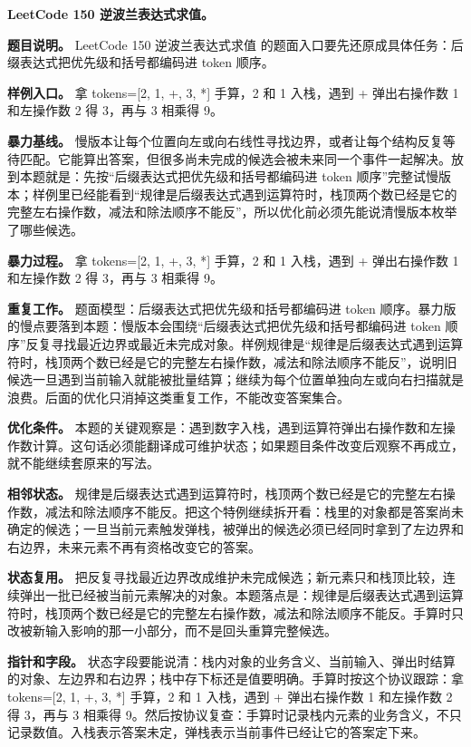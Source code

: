 \noindent\textbf{LeetCode 150 逆波兰表达式求值。}

\textbf{题目说明。} LeetCode 150 逆波兰表达式求值 的题面入口要先还原成具体任务：后缀表达式把优先级和括号都编码进 token 顺序。

\textbf{样例入口。} 拿 tokens=[2, 1, +, 3, *] 手算，2 和 1 入栈，遇到 + 弹出右操作数 1 和左操作数 2 得 3，再与 3 相乘得 9。

\textbf{暴力基线。} 慢版本让每个位置向左或向右线性寻找边界，或者让每个结构反复等待匹配。它能算出答案，但很多尚未完成的候选会被未来同一个事件一起解决。放到本题就是：先按“后缀表达式把优先级和括号都编码进 token 顺序”完整试慢版本；样例里已经能看到“规律是后缀表达式遇到运算符时，栈顶两个数已经是它的完整左右操作数，减法和除法顺序不能反”，所以优化前必须先能说清慢版本枚举了哪些候选。

\textbf{暴力过程。} 拿 tokens=[2, 1, +, 3, *] 手算，2 和 1 入栈，遇到 + 弹出右操作数 1 和左操作数 2 得 3，再与 3 相乘得 9。

\textbf{重复工作。} 题面模型：后缀表达式把优先级和括号都编码进 token 顺序。暴力版的慢点要落到本题：慢版本会围绕“后缀表达式把优先级和括号都编码进 token 顺序”反复寻找最近边界或最近未完成对象。样例规律是“规律是后缀表达式遇到运算符时，栈顶两个数已经是它的完整左右操作数，减法和除法顺序不能反”，说明旧候选一旦遇到当前输入就能被批量结算；继续为每个位置单独向左或向右扫描就是浪费。后面的优化只消掉这类重复工作，不能改变答案集合。

\textbf{优化条件。} 本题的关键观察是：遇到数字入栈，遇到运算符弹出右操作数和左操作数计算。这句话必须能翻译成可维护状态；如果题目条件改变后观察不再成立，就不能继续套原来的写法。

\textbf{相邻状态。} 规律是后缀表达式遇到运算符时，栈顶两个数已经是它的完整左右操作数，减法和除法顺序不能反。把这个特例继续拆开看：栈里的对象都是答案尚未确定的候选；一旦当前元素触发弹栈，被弹出的候选必须已经同时拿到了左边界和右边界，未来元素不再有资格改变它的答案。

\textbf{状态复用。} 把反复寻找最近边界改成维护未完成候选；新元素只和栈顶比较，连续弹出一批已经被当前元素解决的对象。本题落点是：规律是后缀表达式遇到运算符时，栈顶两个数已经是它的完整左右操作数，减法和除法顺序不能反。手算时只改被新输入影响的那一小部分，而不是回头重算完整候选。

\textbf{指针和字段。} 状态字段要能说清：栈内对象的业务含义、当前输入、弹出时结算的对象、左边界和右边界；栈中存下标还是值要明确。手算时按这个协议跟踪：拿 tokens=[2, 1, +, 3, *] 手算，2 和 1 入栈，遇到 + 弹出右操作数 1 和左操作数 2 得 3，再与 3 相乘得 9。然后按协议复查：手算时记录栈内元素的业务含义，不只记录数值。入栈表示答案未定，弹栈表示当前事件已经让它的答案定下来。

